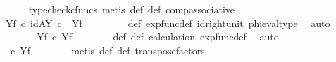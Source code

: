 \begin{isabellebody}
\ \ \ \ \ \ \isamarkupfalse%
\ {\isacharparenleft}{\kern0pt}typecheck{\isacharunderscore}{\kern0pt}cfuncs{\isacharcomma}{\kern0pt}\ metis\ {\isasymphi}{\isacharunderscore}{\kern0pt}def\ {\isasympsi}{\isacharunderscore}{\kern0pt}def\ comp{\isacharunderscore}{\kern0pt}associative{}{\isacharparenright}{\kern0pt}\isanewline
\ \ \ \ \isamarkupfalse%
\ \isamarkupfalse%
\ {\isachardoublequoteopen}{\isachardot}{\kern0pt}{\isachardot}{\kern0pt}{\isachardot}{\kern0pt}\ {\isacharequal}{\kern0pt}\ {\isasympsi}\isactrlbsup Y\isactrlesup \isactrlsub f\ {\isasymcirc}\isactrlsub c\ {\isacharparenleft}{\kern0pt}id{\isacharparenleft}{\kern0pt}A\isactrlbsup Y\isactrlesup {\isacharparenright}{\kern0pt}\ {\isasymcirc}\isactrlsub c\ \ {\isasymphi}\isactrlbsup Y\isactrlesup \isactrlsub f\ {\isacharparenright}{\kern0pt}{\isachardoublequoteclose}\isanewline
\ \ \ \ \ \ \isamarkupfalse%
\ {\isasymphi}{\isacharunderscore}{\kern0pt}def\ exp{\isacharunderscore}{\kern0pt}func{\isacharunderscore}{\kern0pt}def{}\ id{\isacharunderscore}{\kern0pt}right{\isacharunderscore}{\kern0pt}unit{}\ phi{\isacharunderscore}{\kern0pt}eval{\isacharunderscore}{\kern0pt}type\ \isamarkupfalse%
\ auto\isanewline
\ \ \ \ \isamarkupfalse%
\ \isamarkupfalse%
\ {\isachardoublequoteopen}{\isachardot}{\kern0pt}{\isachardot}{\kern0pt}{\isachardot}{\kern0pt}\ {\isacharequal}{\kern0pt}\ {\isasympsi}\isactrlbsup Y\isactrlesup \isactrlsub f\ {\isasymcirc}\isactrlsub c\ {\isasymphi}\isactrlbsup Y\isactrlesup \isactrlsub f{\isachardoublequoteclose}\isanewline
\ \ \ \ \ \ \isamarkupfalse%
\ {\isasymphi}{\isacharunderscore}{\kern0pt}def\ {\isasympsi}{\isacharunderscore}{\kern0pt}def\ calculation\ exp{\isacharunderscore}{\kern0pt}func{\isacharunderscore}{\kern0pt}def{}\ \isamarkupfalse%
\ auto\isanewline
\ \ \ \ \isamarkupfalse%
\ \isamarkupfalse%
\ {\isachardoublequoteopen}{\isachardot}{\kern0pt}{\isachardot}{\kern0pt}{\isachardot}{\kern0pt}\ {\isacharequal}{\kern0pt}\ {\isacharparenleft}{\kern0pt}{\isasympsi}\ {\isasymcirc}\isactrlsub c\ {\isasymphi}{\isacharparenright}{\kern0pt}\isactrlbsup Y\isactrlesup \isactrlsub f{\isachardoublequoteclose}\isanewline
\ \ \ \ \ \ \isamarkupfalse%
\ {\isacharparenleft}{\kern0pt}metis\ {\isasymphi}{\isacharunderscore}{\kern0pt}def\ {\isasympsi}{\isacharunderscore}{\kern0pt}def\ transpose{\isacharunderscore}{\kern0pt}factors{\isacharparenright}{\kern0pt}\isanewline

\end{isabellebody}
